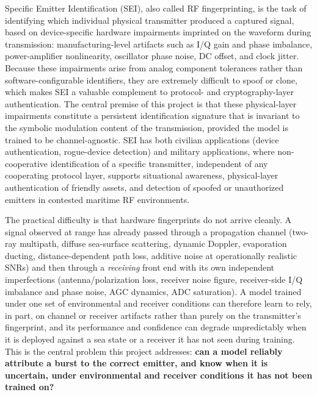 \documentclass{article}
\begin{document}
Specific Emitter Identification (SEI), also called RF fingerprinting, is the task of
identifying which individual physical transmitter produced a captured signal, based on
device-specific hardware impairments imprinted on the waveform during transmission:
manufacturing-level artifacts such as I/Q gain and phase imbalance, power-amplifier
nonlinearity, oscillator phase noise, DC offset, and clock jitter. Because these
impairments arise from analog component tolerances rather than software-configurable
identifiers, they are extremely difficult to spoof or clone, which makes SEI a valuable
complement to protocol- and cryptography-layer authentication. The central premise of
this project is that these physical-layer impairments constitute a persistent
identification signature that is invariant to the symbolic modulation content of the
transmission, provided the model is trained to be channel-agnostic. SEI has both
civilian applications (device authentication, rogue-device detection) and military
applications, where non-cooperative identification of a specific transmitter,
independent of any cooperating protocol layer, supports situational awareness,
physical-layer authentication of friendly assets, and detection of spoofed or
unauthorized emitters in contested maritime RF environments.

The practical difficulty is that hardware fingerprints do not arrive cleanly. A signal
observed at range has already passed through a propagation channel (two-ray multipath,
diffuse sea-surface scattering, dynamic Doppler, evaporation ducting,
distance-dependent path loss, additive noise at operationally realistic SNRs) and then
through a \emph{receiving} front end with its own independent imperfections
(antenna/polarization loss, receiver noise figure, receiver-side I/Q imbalance and phase
noise, AGC dynamics, ADC saturation). A model trained under one set of environmental and
receiver conditions can therefore learn to rely, in part, on channel or receiver
artifacts rather than purely on the transmitter's fingerprint, and its performance and
confidence can degrade unpredictably when it is deployed against a sea state or a
receiver it has not seen during training. This is the central problem this project
addresses: \textbf{can a model reliably attribute a burst to the correct emitter, and
know when it is uncertain, under environmental and receiver conditions it has not been
trained on?}
\end{document}
